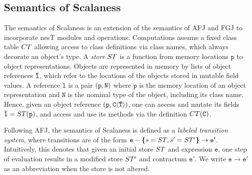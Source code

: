 \subsection{Semantics of Scalaness}

The semantics of Scalaness is an extension of the semantics of AFJ and FGJ to incorporate nesT
modules and operations. Computations assume a fixed class table ${CT}$ allowing access to class
definitions via class names, which always decorate an object's type. A \emph{store} $ST$ is
a function from memory locations $\texttt{p}$ to object representations. Objects are represented
in memory by lists of object references ${\mathtt{\bar{l}}}$, which refer to the locations of the objects
stored in mutable field values. A reference $\texttt{l}$ is a pair $\mathtt{(}\texttt{p},\mathtt{N)}$ where
$\texttt{p}$ is the memory location of an object representation and $\texttt{N}$ is the nominal
type of the object, including its class name. Hence, given an object reference
$\mathtt{(}\texttt{p},\mathtt{\mathtt{C\langle {\ensuremath{\mathtt{\bar{T}}}} \rangle})}$, one can access and mutate its fields ${\mathtt{\bar{l}}} =
ST(\texttt{p})$, and access and use its methods via the definition ${CT}(\texttt{C})$.

Following AFJ, the semantics of Scalaness is defined as a \emph{labeled transition system},
where transitions are of the form $\texttt{e} - \textup{\textbf{\{}} s = ST, s' = ST' \textup{\textbf{\}}} \rightarrow
\texttt{e}' $. Intuitively, this denotes that given an initial store $ST$ and expression
$\texttt{e}$, one step of evaluation results in a modified store $ST'$ and contractum
$\texttt{e}'$. We write $\texttt{e} \rightarrow \texttt{e}'$ as an abbreviation when the store
is not altered.

